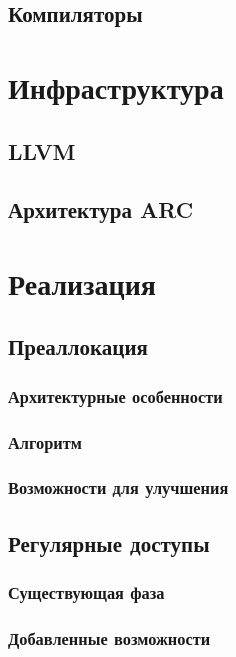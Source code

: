 \documentclass[12pt,a4paper]{article}
\begin{document}
\subsection{Компиляторы}

\section{Инфраструктура}

\subsection{LLVM}

\subsection{Архитектура ARC}

\section{Реализация}

\subsection{Преаллокация}

\subsubsection{Архитектурные особенности}

\subsubsection{Алгоритм}

\subsubsection{Возможности для улучшения}

\subsection{Регулярные доступы}

\subsubsection{Существующая фаза}

\subsubsection{Добавленные возможности}
\end{document}
